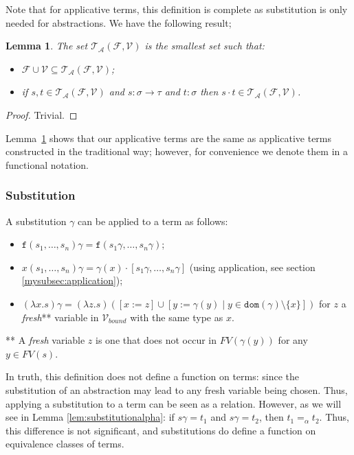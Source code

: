 \documentclass{lmcs}
\theoremstyle{theorem}\newtheorem{theorem}{Theorem}
\theoremstyle{theorem}\newtheorem{lemma}[theorem]{Lemma}
\theoremstyle{theorem}\newtheorem{corollary}[theorem]{Corollary}
\theoremstyle{definition}\newtheorem{definition}[theorem]{Definition}
\theoremstyle{definition}\newtheorem{example}[theorem]{Example}
\newcommand{\F}{\mathcal{F}}
\newcommand{\V}{\mathcal{V}}
\newcommand{\Vbound}{\mathcal{V}_{\mathit{bound}}}
\newcommand{\ATerms}{\mathcal{T}_{\mathcal{A}}}
\newcommand{\FV}{\mathit{FV}}
\newcommand{\domain}{\mathtt{dom}}
\newcommand{\atype}{\sigma}
\newcommand{\btype}{\tau}
\newcommand{\identifier}[1]{\mathtt{#1}}
\newcommand{\afun}{\identifier{f}}
\newcommand{\avar}{x}
\newcommand{\bvar}{y}
\newcommand{\cvar}{z}
\newcommand{\abs}[2]{\lambda #1.#2}
\newcommand{\arrtype}{\rightarrow}
\newcommand{\mysubsection}[1]{\vspace{-12pt}\subsubsection{#1}}
\begin{document}
\bigskip
Note that for applicative terms, this definition is complete as substitution is only needed for
abstractions.  We have the following result;

\begin{lemma}\label{lem:applicative_notation}
The set $\ATerms(\F,\V)$ is the smallest set such that:
\begin{itemize}
\item $\F \cup \V \subseteq \ATerms(\F,\V)$;
\item if $s,t \in \ATerms(\F,\V)$ and $s : \atype \arrtype \btype$ and $t : \atype$ then
  $s \cdot t \in \ATerms(\F,\V)$.
\end{itemize}
\end{lemma}

\begin{proof}
Trivial.
\end{proof}

Lemma~\ref{lem:applicative_notation} shows that our applicative terms are the same as applicative
terms constructed in the traditional way; however, for convenience we denote them in a functional
notation.

\mysubsection{Substitution}\label{mysubsec:substitution}
A substitution $\gamma$ can be applied to a term as follows:
\begin{itemize}
\item $\afun(s_1,\dots,s_n)\gamma = \afun(s_1\gamma,\dots,s_n\gamma)$;
\item $\avar(s_1,\dots,s_n)\gamma = \gamma(\avar) \cdot [s_1\gamma,\dots,s_n\gamma]$
  (using application, see section \ref{mysubsec:application});
\item $(\abs{\avar}{s})\gamma = (\abs{\cvar}{s}) ([\avar:=\cvar] \cup [\bvar := \gamma(\bvar) \mid
  \bvar \in \domain(\gamma) \setminus \{\avar\}])$ for $\cvar$ a \emph{fresh}** variable in
  $\Vbound$ with the same type as $\avar$.
\end{itemize}
** A \emph{fresh} variable $\cvar$ is one that does not occur in $\FV(\gamma(\bvar))$ for any
$\bvar \in \FV(s)$.

In truth, this definition does not define a function on terms: since the substitution of an
abstraction may lead to any fresh variable being chosen.  Thus, applying a substitution to a term
can be seen as a relation.  However, as we will see in Lemma \ref{lem:substitutionalpha}: if
$s\gamma = t_1$ and $s\gamma = t_2$, then $t_1 =_\alpha t_2$.  Thus, this difference is not
significant, and substitutions do define a function on equivalence classes of terms.
\end{document}
